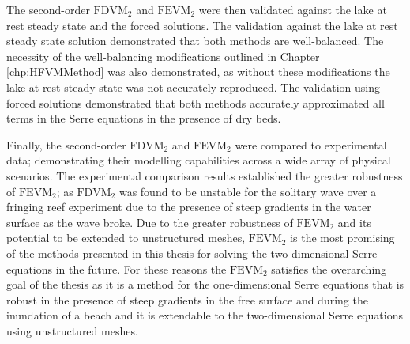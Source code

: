 The second-order $\text{FDVM}_2$ and $\text{FEVM}_2$ were then validated against the lake at rest steady state and the forced solutions. The validation against the lake at rest steady state solution demonstrated that both methods are well-balanced. The necessity of the well-balancing modifications outlined in Chapter \ref{chp:HFVMMethod} was also demonstrated, as without these modifications the lake at rest steady state was not accurately reproduced. The validation using forced solutions demonstrated that both methods accurately approximated all terms in the Serre equations in the presence of dry beds. 

Finally, the second-order $\text{FDVM}_2$ and $\text{FEVM}_2$ were compared to experimental data; demonstrating their modelling capabilities across a wide array of physical scenarios. The experimental comparison results established the greater robustness of $\text{FEVM}_2$; as $\text{FDVM}_2$ was found to be unstable for the solitary wave over a fringing reef experiment due to the presence of steep gradients in the water surface as the wave broke. Due to the greater robustness of $\text{FEVM}_2$ and its potential to be extended to unstructured meshes, $\text{FEVM}_2$ is the most promising of the methods presented in this thesis for solving the two-dimensional Serre equations in the future. For these reasons the $\text{FEVM}_2$ satisfies the overarching goal of the thesis as it is a method for the one-dimensional Serre equations that is robust in the presence of steep gradients in the free surface and during the inundation of a beach and it is extendable to the two-dimensional Serre equations using unstructured meshes.


